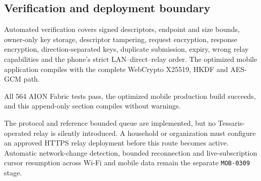 \subsection{Verification and deployment boundary}

Automated verification covers signed descriptors, endpoint and size bounds, owner-only key
storage, descriptor tampering, request encryption, response encryption, direction-separated
keys, duplicate submission, expiry, wrong relay capabilities and the phone's strict
LAN--direct--relay order.  The optimized mobile application compiles with the complete
WebCrypto X25519, HKDF and AES-GCM path.

All 564 AION Fabric tests pass, the optimized mobile production build succeeds, and this
append-only section compiles without warnings.

The protocol and reference bounded queue are implemented, but no Tessaris-operated relay is
silently introduced.  A household or organization must configure an approved HTTPS relay
deployment before this route becomes active.  Automatic network-change detection, bounded
reconnection and live-subscription cursor resumption across Wi-Fi and mobile data remain the
separate \texttt{MOB-0309} stage.
